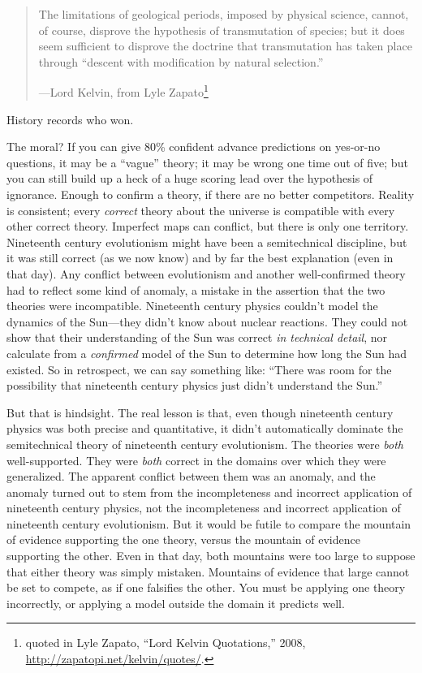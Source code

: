 \begin{quote}
{
 The limitations of geological periods, imposed by physical
science, cannot, of course, disprove the hypothesis of transmutation of
species; but it does seem sufficient to disprove the doctrine that
transmutation has taken place through ``descent with
modification by natural selection.''}

{\raggedleft
 {}---Lord Kelvin, from Lyle Zapato\footnote{quoted in Lyle Zapato, ``Lord Kelvin
Quotations,'' 2008,
\url{http://zapatopi.net/kelvin/quotes/}.}
 \par}
\end{quote}


{
 History records who won.}

{
 The moral? If you can give 80\% confident advance predictions on
yes-or-no questions, it may be a
``vague'' theory; it may be wrong
one time out of five; but you can still build up a heck of a huge
scoring lead over the hypothesis of ignorance. Enough to confirm a
theory, if there are no better competitors. Reality is consistent;
every \textit{correct} theory about the universe is compatible with
every other correct theory. Imperfect maps can conflict, but there is
only one territory. Nineteenth century evolutionism might have been a
semitechnical discipline, but it was still correct (as we now know) and
by far the best explanation (even in that day). Any conflict between
evolutionism and another well-confirmed theory had to reflect some kind
of anomaly, a mistake in the assertion that the two theories were
incompatible. Nineteenth century physics couldn't model
the dynamics of the Sun---they didn't know about
nuclear reactions. They could not show that their understanding of the
Sun was correct \textit{in technical detail}, nor calculate from a
\textit{confirmed} model of the Sun to determine how long the Sun had
existed. So in retrospect, we can say something like:
``There was room for the possibility that nineteenth
century physics just didn't understand the
Sun.''}

{
 But that is hindsight. The real lesson is that, even though
nineteenth century physics was both precise and quantitative, it
didn't automatically dominate the semitechnical theory
of nineteenth century evolutionism. The theories were \textit{both}
well-supported. They were \textit{both} correct in the domains over
which they were generalized. The apparent conflict between them was an
anomaly, and the anomaly turned out to stem from the incompleteness and
incorrect application of nineteenth century physics, not the
incompleteness and incorrect application of nineteenth century
evolutionism. But it would be futile to compare the mountain of
evidence supporting the one theory, versus the mountain of evidence
supporting the other. Even in that day, both mountains were too large
to suppose that either theory was simply mistaken. Mountains of
evidence that large cannot be set to compete, as if one falsifies the
other. You must be applying one theory incorrectly, or applying a model
outside the domain it predicts well.}

